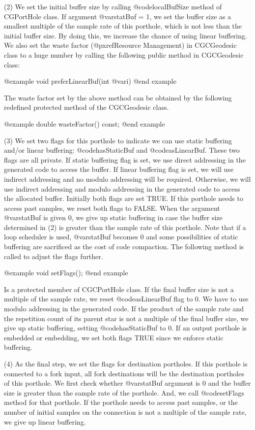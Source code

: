 {(2) We set the initial buffer size by calling @code{localBufSize} method
of CGPortHole class. If argument @var{statBuf} = 1, we set the buffer
size as a smallest multiple of the sample rate of this porthole, which is
not less than the initial buffer size. By doing this, we increase the chance
of using linear buffering. We also set the waste factor 
(@pxref{Resource Management}) in CGCGeodesic
class to a huge number by calling the following public method in CGCGeodesic
class:

@example
void preferLinearBuf(int @var{i})
@end example

The waste factor set by the above method can be obtained by the following
redefined protected method of the CGCGeodesic class.

@example
double wasteFactor() const;
@end example

(3) We set two flags for this porthole to indicate we can use static buffering
and/or linear buffering: @code{hasStaticBuf} and @code{asLinearBuf}. These two
flags are all private. If static buffering flag is set, we use direct
addressing in the generated code to access the buffer. If linear
buffering flag is set, we will use indirect addressing and no modulo addressing
will be required. Otherwise, we will use indirect addressing and modulo
addressing in the generated code to access the allocated buffer.
Initially both flags are set TRUE. If this porthole needs to access past
samples, we reset both flags to FALSE. When the argument @var{statBuf} is
given 0, we give up static buffering in case the buffer size determined
in (2) is greater than the sample rate of this porthole. Note that
if a loop scheduler is used, @var{statBuf} becomes 0 and some
possibilities of static buffering are sacrificed as the cost of
code compaction. The following method is called to adjust the flags further.

@example
void setFlags();
@end example

Is a protected member of CGCPortHole class. If the final buffer size is
not a multiple of the sample rate, we reset @code{asLinearBuf} flag to 0.
We have to use modulo addressing in the generated code. If the
product of the sample rate and the repetition count of its parent star is
not a multiple of the final buffer size, we give up static buffering, setting
@code{hasStaticBuf} to 0. If an output porthole is embedded or embedding,
we set both flags TRUE since we enforce static buffering.

(4) As the final step, we set the flags for destination portholes. If this
porthole is connected to a fork input, all fork destinations will be
the destination portholes of this porthole. We first check whether
@var{statBuf} argument is 0 and the buffer size is greater than the sample
rate of the porthole. And, we call @code{setFlags} method for that porthole.
If the porthole needs to access past samples, or the number of initial
samples on the connection is not a multiple of the sample rate, we give up
linear buffering.

}
